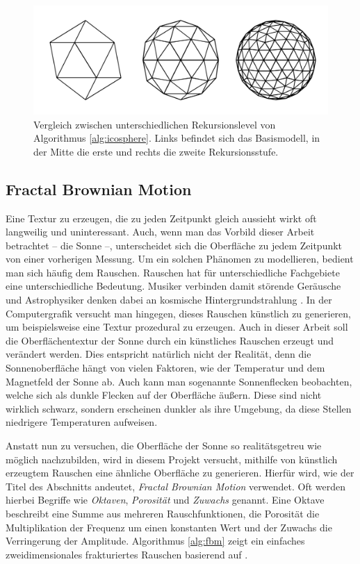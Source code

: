 \begin{figure}
  \includegraphics[width=\columnwidth]{icosphere-algorithm}
  \caption{Vergleich zwischen unterschiedlichen Rekursionslevel von Algorithmus \ref{alg:icosphere}. Links befindet sich das Basismodell, in der Mitte die erste und rechts die zweite Rekursionsstufe.}
  \label{fig:icosphere-levels}
  \Description[]{}
\end{figure}

\subsection{Fractal Brownian Motion}
Eine Textur zu erzeugen, die zu jeden Zeitpunkt gleich aussieht wirkt oft
langweilig und uninteressant. Auch, wenn man das Vorbild dieser Arbeit
betrachtet -- die Sonne --, unterscheidet sich die Oberfläche zu jedem
Zeitpunkt von einer vorherigen Messung. Um ein solchen Phänomen zu
modellieren, bedient man sich häufig dem Rauschen. Rauschen hat für
unterschiedliche Fachgebiete eine unterschiedliche Bedeutung. Musiker
verbinden damit störende Geräusche und Astrophysiker denken dabei an
kosmische Hintergrundstrahlung \cite{bookofshaders}. In der Computergrafik
versucht man hingegen, dieses Rauschen künstlich zu generieren, um
beispielsweise eine Textur prozedural zu erzeugen. Auch in dieser Arbeit soll
die Oberflächentextur der Sonne durch ein künstliches Rauschen erzeugt und
verändert werden. Dies entspricht natürlich nicht der Realität, denn die
Sonnenoberfläche hängt von vielen Faktoren, wie der Temperatur und dem
Magnetfeld der Sonne ab. Auch kann man sogenannte Sonnenflecken beobachten,
welche sich als dunkle Flecken auf der Oberfläche äußern. Diese sind nicht
wirklich schwarz, sondern erscheinen dunkler als ihre Umgebung, da diese
Stellen niedrigere Temperaturen aufweisen.

Anstatt nun zu versuchen, die Oberfläche der Sonne so realitätsgetreu wie
möglich nachzubilden, wird in diesem Projekt versucht, mithilfe von künstlich
erzeugtem Rauschen eine ähnliche Oberfläche zu generieren. Hierfür wird, wie
der Titel des Abschnitts andeutet, \textit{Fractal Brownian Motion} verwendet.
Oft werden hierbei Begriffe wie \textit{Oktaven}, \textit{Porosität} und
\textit{Zuwachs} genannt. Eine Oktave beschreibt eine Summe aus mehreren
Rauschfunktionen, die Porosität die Multiplikation der Frequenz um einen konstanten
Wert und der Zuwachs die Verringerung der Amplitude. Algorithmus \ref{alg:fbm} zeigt
ein einfaches zweidimensionales frakturiertes Rauschen basierend auf \cite{bookofshaders}.

